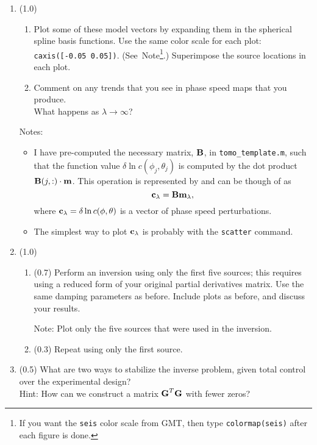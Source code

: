 \documentclass[11pt,titlepage,fleqn]{article}
\begin{document}
\begin{enumerate}
\item (1.0) 

\begin{enumerate}
\item Plot some of these model vectors by expanding them in the spherical spline basis functions. Use the same color scale for each plot: \verb+caxis([-0.05 0.05])+. (See~Note\footnote{If you want the {\tt seis} color scale from GMT, then type {\tt colormap(seis)} after each figure is done.}.) Superimpose the source locations in each plot.

\item Comment on any trends that you see in phase speed maps that you produce. \\
What happens as $\lambda \rightarrow \infty$?
\end{enumerate}

Notes:
%
\begin{itemize}
\item I have pre-computed the necessary matrix, $\mbox{${\bf B}$}$, in \verb+tomo_template.m+, such that the function value $\delta\ln c(\phi_j, \theta_j)$ is computed by the dot product $\mbox{${\bf B}$}(j,:) \cdot \mbox{${\bf m}$}$. This operation is represented by  and can be though of as
%
\begin{equation}
\mbox{${\bf c}$}_{\lambda} = \mbox{${\bf B}$} \mbox{${\bf m}$}_{\lambda},
\end{equation}
%
where $\mbox{${\bf c}$}_{\lambda} = \delta\ln c(\phi, \theta)$ is a vector of phase speed perturbations.

\item The simplest way to plot $\mbox{${\bf c}$}_{\lambda}$ is probably with the \verb+scatter+ command.

\end{itemize}

\item (1.0)
%
\begin{enumerate}
\item (0.7) Perform an inversion using only the first five sources; this requires using a reduced form of your original partial derivatives matrix. Use the same damping parameters as before. Include plots as before, and discuss your results.

Note: Plot only the five sources that were used in the inversion.

\item (0.3) Repeat using only the first source.
\end{enumerate}

\item (0.5) What are two ways to stabilize the inverse problem, given total control over the experimental design?  \\
Hint: How can we construct a matrix $\mbox{${\bf G}$}^T\mbox{${\bf G}$}$ with fewer zeros?

\end{enumerate}
\end{document}
